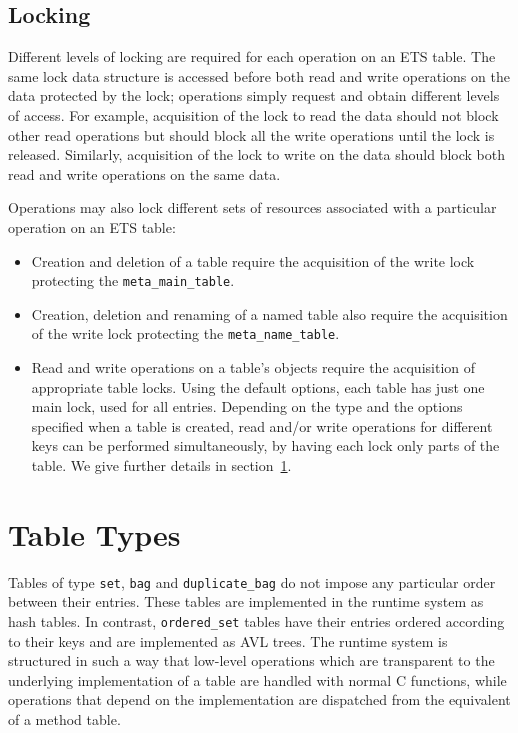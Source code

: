 \documentclass[aps,pre,preprint,nofootinbib]{revtex4}
\begin{document}
\subsection{Locking} \label{sec:tables_locking}

Different levels of locking are required for each operation on an ETS table.
The same lock data structure is accessed before both read and write operations on the data protected by the lock; operations simply request and obtain different levels of access.
For example, acquisition of the lock to read the data should not block other read operations but should block all the write operations until the lock is released.
Similarly, acquisition of the lock to write on the data should block both read and write operations on the same data.

Operations may also lock different sets of resources associated with a particular operation on an ETS table:
\begin{itemize}
\item Creation and deletion of a table require the acquisition of the write lock protecting the \verb|meta_main_table|.
\item Creation, deletion and renaming of a named table also require the acquisition of the write lock protecting the \verb|meta_name_table|.
\item Read and write operations on a table's objects require the acquisition of appropriate table locks.
  Using the default options, each table has just one main lock, used for all entries.
  Depending on the type and the options specified when a table is created, read and/or write operations for different keys can be performed simultaneously, by having each lock only parts of the table.
  We give further details in section~\ref{sec:table_types}.
\end{itemize}

\section{Table Types} \label{sec:table_types}

Tables of type \verb|set|, \verb|bag| and \verb|duplicate_bag| do not impose any particular order between their entries.
These tables are implemented in the runtime system as hash tables.
In contrast, \verb|ordered_set| tables have their entries ordered according to their keys and are implemented as AVL trees.
The runtime system is structured in such a way that low-level operations which are transparent to the underlying implementation of a table are handled with normal C functions, while operations that depend on the implementation are dispatched from the equivalent of a method table.
\end{document}
